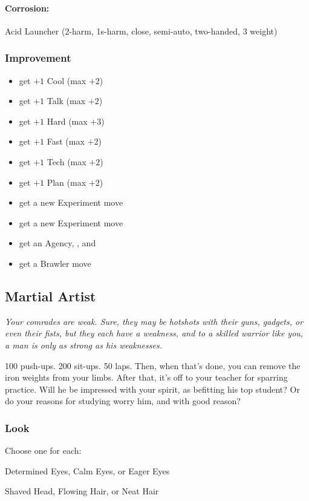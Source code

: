 \paragraph{Corrosion:} Acid Launcher (2-harm, 1s-harm, close, semi-auto, two-handed, 3 weight)

\subsubsection{Improvement}
\begin{itemize}
\item get $+1$ Cool (max $+2$)
\item get $+1$ Talk (max $+2$)
\item get $+1$ Hard (max $+3$)
\item get $+1$ Fast (max $+2$)
\item get $+1$ Tech (max $+2$)
\item get $+1$ Plan (max $+2$)
\item get a new Experiment move
\item get a new Experiment move
\item get an Agency, , and 
\item get a Brawler move
\end{itemize}



\subsection{Martial Artist}
{\itshape Your comrades are weak. Sure, they may be hotshots with
  their guns, gadgets, or even their fists, but they each have a
  weakness, and to a skilled warrior like you, a man is only as strong
  as his weaknesses.

100 push-ups. 200 sit-ups. 50 laps. Then, when that's done, you can
remove the iron weights from your limbs. After that, it's off to your
teacher for sparring practice. Will he be impressed with your spirit,
as befitting his top student? Or do your reasons for studying worry
him, and with good reason?}
\subsubsection{Look}
Choose one for each:

Determined Eyes, Calm Eyes, or Eager Eyes

Shaved Head, Flowing Hair, or Neat Hair


